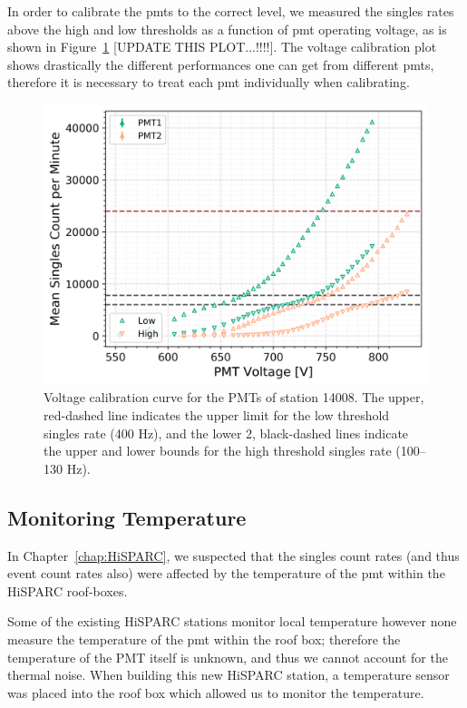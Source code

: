 In order to calibrate the \glspl{pmt} to the correct level, we measured the singles rates above the high and low thresholds as a function of \gls{pmt} operating voltage, as is shown in Figure~\ref{fig:PMT_cal} [UPDATE THIS PLOT...!!!!]. The voltage calibration plot shows drastically the different performances one can get from different \glspl{pmt}, therefore it is necessary to treat each \gls{pmt} individually when calibrating.

\begin{figure}[ht!]
	\centering
	\includegraphics[width=0.8\columnwidth]{both_PMTs_post_NIM.png}
	\caption{Voltage calibration curve for the PMTs of station 14008. The upper, red-dashed line indicates the upper limit for the low threshold singles rate (400 Hz), and the lower 2, black-dashed lines indicate the upper and lower bounds for the high threshold singles rate (100--130 Hz).}
	\label{fig:PMT_cal}
\end{figure}




\subsection{Monitoring Temperature}

In Chapter~\ref{chap:HiSPARC}, we suspected that the singles count rates (and thus event count rates also) were affected by the temperature of the \gls{pmt} within the HiSPARC roof-boxes.

Some of the existing HiSPARC stations monitor local temperature however none measure the temperature of the \gls{pmt} within the roof box; therefore the temperature of the PMT itself is unknown, and thus we cannot account for the thermal noise. When building this new HiSPARC station, a temperature sensor was placed into the roof box which allowed us to monitor the temperature.

